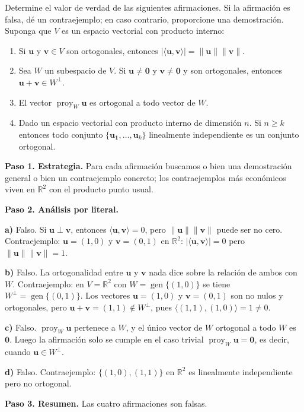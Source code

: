 \begin{prob}
Determine el valor de verdad de las siguientes afirmaciones. Si la afirmación es falsa, dé un contraejemplo; en caso contrario, proporcione una demostración. Suponga que $V$ es un espacio vectorial con producto interno:
\begin{enumerate}
\item Si $\mathbf{u}$ y $\mathbf{v}\in V$ son ortogonales, entonces $|\langle \mathbf{u},\mathbf{v} \rangle|=\lVert \mathbf{u} \rVert \lVert \mathbf{v} \rVert$.
\item Sea $W$ un subespacio de $V$. Si $\mathbf{u}\neq \mathbf{0}$ y $ \mathbf{v}\neq \mathbf{0}$ y son ortogonales, entonces $  \mathbf{u}+\mathbf{v} \in W^{\perp}$.
\item El vector $\operatorname{proy}_{W}\mathbf{u}$ es ortogonal a todo vector de $W$.
\item Dado un espacio vectorial con producto interno de dimensión $n$. Si $n\geq k$ entonces todo conjunto $\{\mathbf{u_1},\dots, \mathbf{u}_k\}$ linealmente independiente es un conjunto ortogonal.
\end{enumerate}
\begin{myproof}
\textbf{Paso 1. Estrategia.} Para cada afirmación buscamos o bien una demostración general o bien un contraejemplo concreto; los contraejemplos más económicos viven en $\mathbb{R}^2$ con el producto punto usual.

\textbf{Paso 2. Análisis por literal.}

\textbf{a)} Falso. Si \( \mathbf{u} \perp \mathbf{v} \), entonces \( \langle \mathbf{u}, \mathbf{v} \rangle = 0 \), pero \( \|\mathbf{u}\|\|\mathbf{v}\| \) puede ser no cero. Contraejemplo: $\mathbf{u}=(1,0)$ y $\mathbf{v}=(0,1)$ en $\mathbb{R}^2$: $|\langle \mathbf{u},\mathbf{v} \rangle| = 0$ pero $\|\mathbf{u}\|\|\mathbf{v}\| = 1$.

\textbf{b)} Falso. La ortogonalidad entre $\mathbf{u}$ y $\mathbf{v}$ nada dice sobre la relación de ambos con $W$. Contraejemplo: en $V=\mathbb{R}^2$ con $W=\operatorname{gen}\{(1,0)\}$ se tiene $W^{\perp}=\operatorname{gen}\{(0,1)\}$. Los vectores $\mathbf{u}=(1,0)$ y $\mathbf{v}=(0,1)$ son no nulos y ortogonales, pero $\mathbf{u}+\mathbf{v}=(1,1) \notin W^{\perp}$, pues $\langle (1,1),(1,0) \rangle = 1 \neq 0$.

\textbf{c)} Falso. $\operatorname{proy}_W \mathbf{u}$ pertenece a $W$, y el único vector de $W$ ortogonal a todo $W$ es $\mathbf{0}$. Luego la afirmación solo se cumple en el caso trivial $\operatorname{proy}_W \mathbf{u} = \mathbf{0}$, es decir, cuando $\mathbf{u} \in W^{\perp}$.

\textbf{d)} Falso. Contraejemplo: $\{(1,0), (1,1)\}$ en $\mathbb{R}^2$ es linealmente independiente pero no ortogonal.

\textbf{Paso 3. Resumen.} Las cuatro afirmaciones son falsas.
\end{myproof}
\end{prob}

